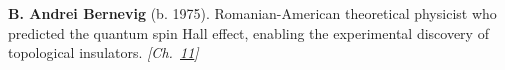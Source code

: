 \textbf{B. Andrei Bernevig} (b. 1975). Romanian-American theoretical physicist who predicted the quantum spin Hall effect, enabling the experimental discovery of topological insulators. \emph{[Ch.~\hyperref[ch:topologicalinsulators]{11}]}

